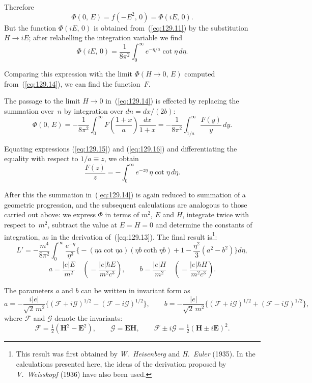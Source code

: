 \noindent Therefore
\[
\Phi(0,\,E) = f(-E^2,\,0) = \Phi(iE,\,0).
\]
But the function $\Phi(iE,\,0)$ is obtained from~(\ref{eq:129.11}) by the substitution $H\to iE$; after relabelling the integration variable we find
\begin{equation}
\Phi(iE,\,0) = \frac{1}{8\pi^2}\int_0^{\infty}e^{-\eta/a}\cot\eta\,d\eta.
\label{eq:129.15}
\end{equation}

Comparing this expression with the limit $\Phi(H\to 0,\,E)$ computed from~(\ref{eq:129.14}), we can find the function~$F$.

The passage to the limit $H\to 0$ in~(\ref{eq:129.14}) is effected by replacing the summation over~$n$ by integration over $dn = dx/(2b)$:
\begin{equation}
\Phi(0,\,E) = -\frac{1}{8\pi^2}\int_0^{\infty}F\!\left(\frac{1+x}{a}\right)\frac{dx}{1+x} = -\frac{1}{8\pi^2}\int_{1/a}^{\infty}\frac{F(y)}{y}\,dy.
\label{eq:129.16}
\end{equation}

Equating expressions (\ref{eq:129.15}) and (\ref{eq:129.16}) and differentiating the equality with respect to $1/a \equiv z$, we obtain
\[
\frac{F(z)}{z} = -\int_0^{\infty}e^{-z\eta}\,\eta\cot\eta\,d\eta.
\]

After this the summation in~(\ref{eq:129.14}) is again reduced to summation of a geometric progression, and the subsequent calculations are analogous to those carried out above: we express $\Phi$ in terms of $m^2$, $E$ and $H$, integrate twice with respect to~$m^2$, subtract the value at $E = H = 0$ and determine the constants of integration, as in the derivation of~(\ref{eq:129.13}). The final result is\footnote{This result was first obtained by \emph{W.~Heisenberg} and \emph{H.~Euler} (1935). In the calculations presented here, the ideas of the derivation proposed by \emph{V.~Weisskopf} (1936) have also been used.}:
\begin{equation}
L' = -\frac{m^4}{8\pi^2}\int_0^{\infty}\frac{e^{-\eta}}{\eta^3}\biggl\{-(\eta a\cot\eta a)(\eta b\coth\eta b) + 1 - \frac{\eta^2}{3}(a^2-b^2)\biggr\}d\eta,
\label{eq:129.17}
\end{equation}
\[
a = \frac{|e|E}{m^2}\quad\left(=\frac{|e|\hbar E}{m^2c^3}\right),\qquad b = \frac{|e|H}{m^2}\quad\left(=\frac{|e|\hbar H}{m^2c^3}\right).
\]


The parameters $a$ and $b$ can be written in invariant form as
\begin{equation}
a = -\frac{i|e|}{\sqrt{2}\,m^2}\bigl\{(\mathcal{F}+i\mathcal{G})^{1/2} - (\mathcal{F}-i\mathcal{G})^{1/2}\bigr\},\qquad b = -\frac{|e|}{\sqrt{2}\,m^2}\bigl\{(\mathcal{F}+i\mathcal{G})^{1/2} + (\mathcal{F}-i\mathcal{G})^{1/2}\bigr\},
\label{eq:129.18}
\end{equation}
where $\mathcal{F}$ and $\mathcal{G}$ denote the invariants:
\begin{equation}
\mathcal{F} = \tfrac{1}{2}(\mathbf{H}^2-\mathbf{E}^2),\qquad \mathcal{G} = \mathbf{E}\mathbf{H},\qquad \mathcal{F}\pm i\mathcal{G} = \tfrac{1}{2}(\mathbf{H}\pm i\mathbf{E})^2.
\label{eq:129.19}
\end{equation}

